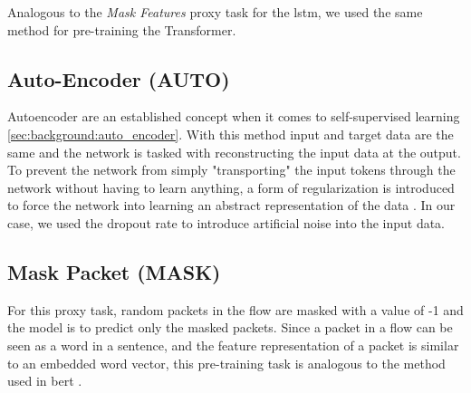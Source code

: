 Analogous to the \textit{Mask Features} proxy task for the \gls{lstm}, we used the same method for pre-training the Transformer.

\subsection{Auto-Encoder (AUTO)} \label{sec:experiments:transformer:auto_encoder}

Autoencoder are an established concept when it comes to self-supervised learning \ref{sec:background:auto_encoder}. With this method input and target data are the same and the network is tasked with reconstructing the input data at the output. To prevent the network from simply "transporting" the input tokens through the network without having to learn anything, a form of regularization is introduced to force the network into learning an abstract representation of the data \cite{autoencoders}. 
In our case, we used the dropout rate to introduce artificial noise into the input data.

\subsection{Mask Packet (MASK)} \label{sec:experiments:transformer:mask_packet}

For this proxy task, random packets in the flow are masked with a value of -1 and the model is to predict only the masked packets. Since a packet in a flow can be seen as a word in a sentence, and the feature representation of a packet is similar to an embedded word vector, this pre-training task is analogous to the method used in \gls{bert} \cite{bert}. 

\newpage
